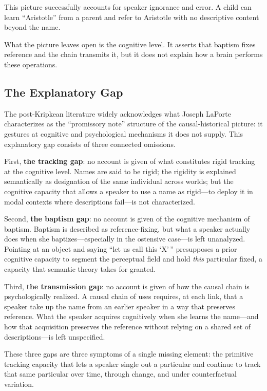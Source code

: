 \documentclass[10pt]{article}
\begin{document}
This picture successfully accounts for speaker ignorance and error. A child can learn ``Aristotle'' from a parent and refer to Aristotle with no descriptive content beyond the name.

What the picture leaves open is the cognitive level. It asserts that baptism fixes reference and the chain transmits it, but it does not explain how a brain performs these operations.

\subsection{The Explanatory Gap}\label{the-explanatory-gap}

The post-Kripkean literature widely acknowledges what Joseph LaPorte characterizes as the ``promissory note'' structure of the causal-historical picture: it gestures at cognitive and psychological mechanisms it does not supply. This explanatory gap consists of three connected omissions.

First, \textbf{the tracking gap}: no account is given of what constitutes rigid tracking at the cognitive level. Names are said to be rigid; the rigidity is explained semantically as designation of the same individual across worlds; but the cognitive capacity that allows a speaker to use a name as rigid---to deploy it in modal contexts where descriptions fail---is not characterized.

Second, \textbf{the baptism gap}: no account is given of the cognitive mechanism of baptism. Baptism is described as reference-fixing, but what a speaker actually does when she baptizes---especially in the ostensive case---is left unanalyzed. Pointing at an object and saying ``let us call this `X'\,'' presupposes a prior cognitive capacity to segment the perceptual field and hold \emph{this} particular fixed, a capacity that semantic theory takes for granted.

Third, \textbf{the transmission gap}: no account is given of how the causal chain is psychologically realized. A causal chain of uses requires, at each link, that a speaker take up the name from an earlier speaker in a way that preserves reference. What the speaker acquires cognitively when she learns the name---and how that acquisition preserves the reference without relying on a shared set of descriptions---is left unspecified.

These three gaps are three symptoms of a single missing element: the primitive tracking capacity that lets a speaker single out a particular and continue to track that same particular over time, through change, and under counterfactual variation.
\end{document}
